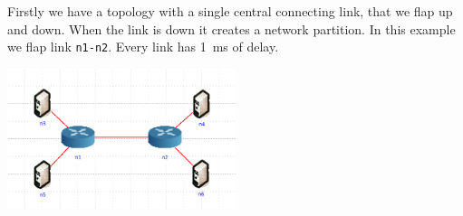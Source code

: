 \documentclass[withindex,glossary,openany]{cam-thesis}
\begin{document}
Firstly we have a topology with a single central connecting link, that we flap up and down. When the link is down it creates a network partition. In this example we flap link \texttt{n1-n2}. Every link has \SI{1}{\ms} of delay.

\begin{minipage}{1\textwidth} \centering
	\includegraphics[width=0.5\textwidth]{delay_partition_topology}
	\label{fig:partition_topology}
\end{minipage}
\end{document}
